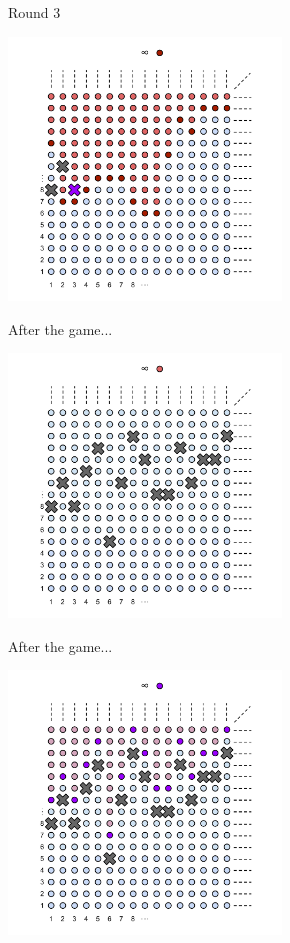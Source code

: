\documentclass{beamer}
\begin{document}
\begin{frame}
Round 3
\begin{center}
    \includegraphics[height=7cm]{images/topdarts_fan_p3}
  \end{center}
\end{frame}
\begin{frame}
After the game...
\begin{center}
    \includegraphics[height=7cm]{images/topdarts_fan_finale}
  \end{center}
\end{frame}
\begin{frame}
After the game...
\begin{center}
    \includegraphics[height=7cm]{images/topdarts_fan_finale2}
  \end{center}
\end{frame}
\end{document}
